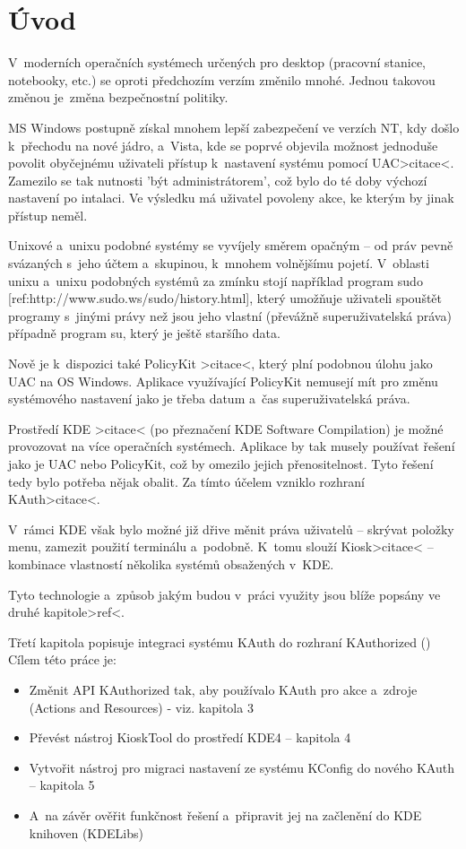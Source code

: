 \chapter{Úvod}
V~moderních operačních systémech určených pro desktop (pracovní stanice,
notebooky, etc.) se oproti předchozím verzím změnilo mnohé. Jednou takovou
změnou je~změna bezpečnostní politiky.

MS Windows postupně získal mnohem lepší zabezpečení ve verzích NT, kdy došlo
k~přechodu na nové jádro, a~Vista, kde se poprvé objevila možnost jednoduše
povolit obyčejnému uživateli přístup k~nastavení systému pomocí UAC>citace<.
Zamezilo se tak nutnosti 'být administrátorem', což bylo do té doby výchozí
nastavení po intalaci. Ve výsledku má uživatel povoleny akce, ke kterým by jinak
přístup neměl.

Unixové a~unixu podobné systémy se vyvíjely směrem opačným -- od práv pevně
svázaných s~jeho účtem a~skupinou, k~mnohem volnějšímu pojetí. V~oblasti unixu
a~unixu podobných systémů za zmínku stojí například program sudo
[ref:http://www.sudo.ws/sudo/history.html], který umožňuje uživateli spouštět
programy s~jinými právy než jsou jeho vlastní (převážně superuživatelská práva)
případně program su, který je ještě staršího data.

Nově je k~dispozici také PolicyKit >citace<, který plní podobnou úlohu jako UAC
na OS Windows. Aplikace využívající PolicyKit nemusejí mít pro změnu systémového
nastavení jako je třeba datum a~čas superuživatelská práva.

Prostředí KDE >citace< (po přeznačení KDE Software Compilation) je možné
provozovat na více operačních systémech. Aplikace by tak musely používat řešení
jako je UAC nebo PolicyKit, což by omezilo jejich přenositelnost. Tyto řešení
tedy bylo potřeba nějak obalit. Za tímto účelem vzniklo rozhraní KAuth>citace<.

V~rámci KDE však bylo možné již dřive měnit práva uživatelů -- skrývat položky
menu, zamezit použití terminálu a~podobně. K~tomu slouží Kiosk>citace<
-- kombinace vlastností několika systémů obsažených v~KDE.

Tyto technologie a~způsob jakým budou v~práci využity jsou blíže popsány ve
druhé kapitole>ref<.

Třetí kapitola popisuje integraci systému KAuth do rozhraní KAuthorized ()
Cílem této práce je:
\begin{itemize}
\item Změnit API KAuthorized tak, aby používalo KAuth pro akce a~zdroje (Actions
 and Resources) - viz. kapitola 3
\item Převést nástroj KioskTool do prostředí KDE4 -- kapitola 4
\item Vytvořit nástroj pro migraci nastavení ze systému KConfig do nového KAuth
-- kapitola 5
\item A~na závěr ověřit funkčnost řešení a~připravit jej na začlenění do KDE
knihoven (KDELibs)
\end{itemize}

